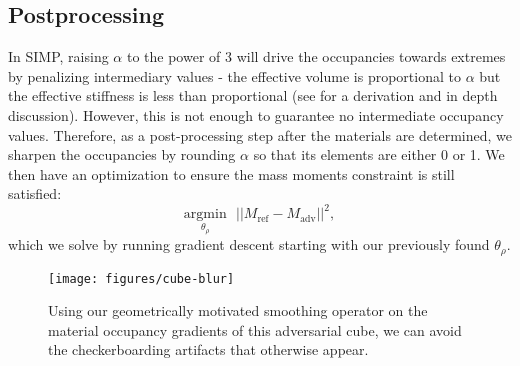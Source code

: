 \subsection{Postprocessing}
In SIMP, raising $\alpha$ to the power of 3 will drive the occupancies towards extremes by penalizing intermediary values - the effective volume is proportional to $\alpha$ but the effective stiffness is less than proportional (see \citet{topology-opt-reference} for a derivation and in depth discussion). 
However, this is not enough to guarantee no intermediate occupancy values. Therefore, as a post-processing step after the materials are determined, we sharpen the occupancies by rounding $\alpha$ so that its elements are either 0 or 1.
We then have an optimization to ensure the mass moments constraint is still satisfied:
\begin{equation}
	\underset{\theta_\rho}{\mathrm{argmin}} \text{    } || M_\text{ref} - M_\text{adv} ||^2,
\end{equation}
which we solve by running gradient descent starting with our previously found $\theta_\rho$.
\begin{figure}[t]
	\texttt{[image: figures/cube-blur]}
	\vspace{-0.7cm}
	\caption{Using our geometrically motivated smoothing operator on the material occupancy gradients of this adversarial cube, we can avoid the checkerboarding artifacts that otherwise appear.}
	\label{fig:topology-opt-checkerboard}
\end{figure}
